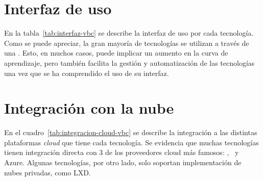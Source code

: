 \section{Interfaz de uso}
\noindent
En la tabla~\ref{tab:interfaz-vbc} se describe la interfaz de uso por cada tecnología. Como se puede apreciar, la gran mayoría de tecnologías se utilizan a través de una \CLI. Esto, en muchos casos, puede implicar un aumento en la curva de aprendizaje, pero también facilita la gestión y automatización de las tecnologías una vez que se ha comprendido el uso de su interfaz.


\section{Integración con la nube}
\noindent
En el cuadro~\ref{tab:integracion-cloud-vbc} se describe la integración a las distintas plataformas \textit{cloud} que tiene cada tecnología. Se evidencia que muchas tecnologías tienen integración directa con 3 de los proveedores cloud más famosos: \AWS, \GCP\ y Azure. Algunas tecnologías, por otro lado, solo soportan implementación de nubes privadas, como LXD.\@


\clearpage
